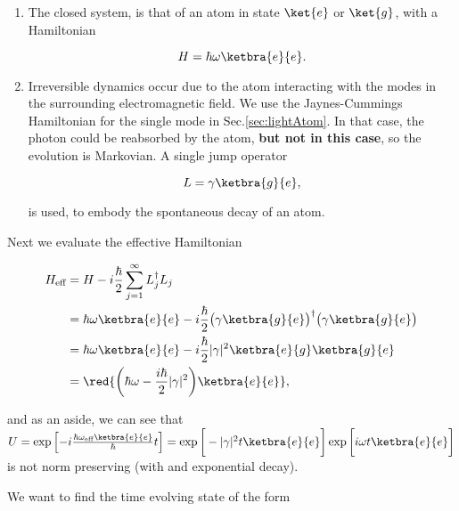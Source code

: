 \begin{enumerate}
	\item The closed system, is that of an atom in state $\ket{e}$ or $\ket{g}$, with a Hamiltonian
	
	\begin{equation}
	\label{eqn:exampleH}
	H = \hbar\omega\ketbra{e}{e}.
	\end{equation}
	
	\item Irreversible dynamics occur due to the atom interacting with the modes in the surrounding electromagnetic field. We use the Jaynes-Cummings Hamiltonian for the single mode in Sec.\ref{sec:lightAtom}. In that case, the photon could be reabsorbed by the atom, \textbf{but not in this case}, so the evolution is Markovian. A single jump operator
	
	\begin{equation}
	\label{eqn:exampleJump}
	L = \gamma\ketbra{g}{e},
	\end{equation}
	
	\noindent is used, to embody the spontaneous decay of an atom. 
\end{enumerate}

Next we evaluate the effective Hamiltonian

\begin{equation}
\begin{aligned}
H_\text{eff} & = H - i\frac{\hbar}{2}\sum_{j=1}^{\infty}L_j^\dagger L_j\\
& = \hbar\omega\ketbra{e}{e} -i\frac{\hbar}{2}\big(\gamma\ketbra{g}{e}\big)^\dagger\big(\gamma\ketbra{g}{e}\big)\\
& = \hbar\omega\ketbra{e}{e} -i\frac{\hbar}{2}|\gamma|^2\ketbra{e}{g}\ketbra{g}{e}\\
& = \red{\bigg(\hbar\omega-\frac{i\hbar}{2}|\gamma|^2\bigg)\ketbra{e}{e}},
\end{aligned}
\end{equation}

\noindent and as an aside, we can see that $U = \exp\left[-i\frac{\hbar\omega_\text{eff}\ketbra{e}{e}}{\hbar}t\right] = \exp\bigg[-|\gamma|^2t\ketbra{e}{e}\bigg]\exp\bigg[i\omega t\ketbra{e}{e}\bigg]$ is not norm preserving (with and exponential decay).

We want to find the time evolving state of the form


